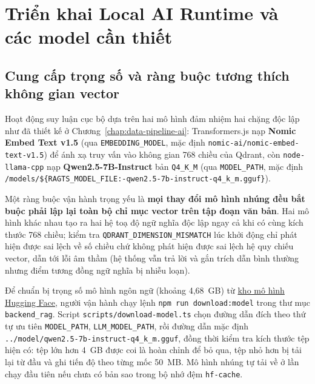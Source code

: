 \section{Triển khai Local AI Runtime và các model cần thiết}
\label{sec:trien-khai-local-ai}

\subsection{Cung cấp trọng số và ràng buộc tương thích không gian vector}
\label{subsec:tai-trong-so}

Hoạt động suy luận cục bộ dựa trên hai mô hình đảm nhiệm hai chặng độc lập như đã thiết kế ở Chương~\ref{chap:data-pipeline-ai}: Transformers.js nạp \textbf{Nomic Embed Text v1.5} (qua \texttt{EMBEDDING\_\allowbreak{}MODEL}, mặc định \texttt{nomic-\allowbreak{}ai/\allowbreak{}nomic-\allowbreak{}embed-\allowbreak{}text-\allowbreak{}v1.\allowbreak{}5}) để ánh xạ truy vấn vào không gian 768 chiều của Qdrant, còn \texttt{node-\allowbreak{}llama-\allowbreak{}cpp} nạp \textbf{Qwen2.5-7B-Instruct} bản \texttt{Q4\_\allowbreak{}K\_\allowbreak{}M} (qua \texttt{MODEL\_\allowbreak{}PATH}, mặc định \texttt{/\allowbreak{}models/\allowbreak{}\$\{RAGTS\_\allowbreak{}MODEL\_\allowbreak{}FILE:\allowbreak{}-\allowbreak{}qwen2.\allowbreak{}5-\allowbreak{}7b-\allowbreak{}instruct-\allowbreak{}q4\_\allowbreak{}k\_\allowbreak{}m.\allowbreak{}gguf\}}).

Một ràng buộc vận hành trọng yếu là \textbf{mọi thay đổi mô hình nhúng đều bắt buộc phải lập lại toàn bộ chỉ mục vector trên tập đoạn văn bản}. Hai mô hình khác nhau tạo ra hai hệ toạ độ ngữ nghĩa độc lập ngay cả khi có cùng kích thước 768 chiều; kiểm tra \texttt{QDRANT\_\allowbreak{}DIMENSION\_\allowbreak{}MISMATCH} lúc khởi động chỉ phát hiện được sai lệch về số chiều chứ không phát hiện được sai lệch hệ quy chiếu vector, dẫn tới lỗi âm thầm (hệ thống vẫn trả lời và gắn trích dẫn bình thường nhưng điểm tương đồng ngữ nghĩa bị nhiễu loạn).

Để chuẩn bị trọng số mô hình ngôn ngữ (khoảng 4,68~GB) từ \href{https://huggingface.co/bartowski/Qwen2.5-7B-Instruct-GGUF}{kho mô hình Hugging Face}, người vận hành chạy lệnh \texttt{npm run download:model} trong thư mục \texttt{backend\_\allowbreak{}rag}. Script \texttt{scripts/\allowbreak{}download-\allowbreak{}model.\allowbreak{}ts} chọn đường dẫn đích theo thứ tự ưu tiên \texttt{MODEL\_\allowbreak{}PATH}, \texttt{LLM\_\allowbreak{}MODEL\_\allowbreak{}PATH}, rồi đường dẫn mặc định \texttt{.\allowbreak{}.\allowbreak{}/\allowbreak{}model/\allowbreak{}qwen2.\allowbreak{}5-\allowbreak{}7b-\allowbreak{}instruct-\allowbreak{}q4\_\allowbreak{}k\_\allowbreak{}m.\allowbreak{}gguf}, đồng thời kiểm tra kích thước tệp hiện có: tệp lớn hơn 4~GB được coi là hoàn chỉnh để bỏ qua, tệp nhỏ hơn bị tải lại từ đầu và ghi tiến độ theo từng mốc 50~MB. Mô hình nhúng tự tải về ở lần chạy đầu tiên nếu chưa có bản sao trong bộ nhớ đệm \texttt{hf-\allowbreak{}cache}.

